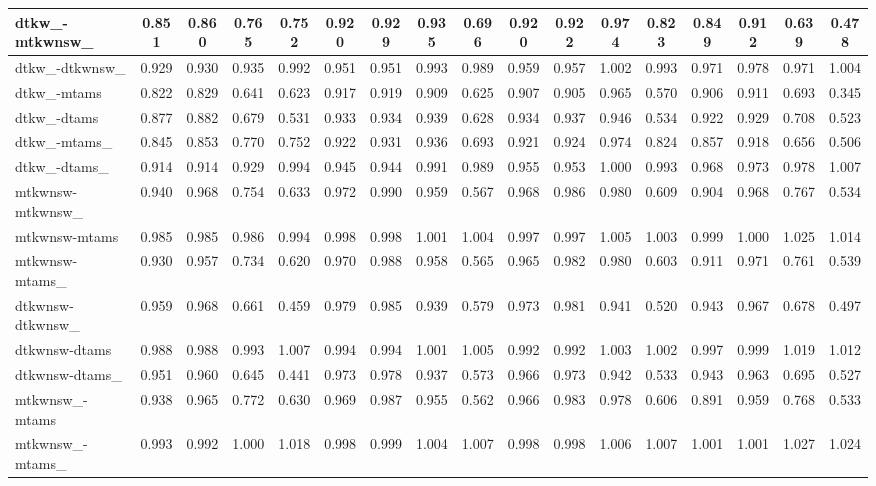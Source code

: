 \documentclass[%
 aip,
 jmp,%
 amsmath,amssymb,
 reprint,%
]{revtex4-1}
\begin{document}
\begin{longtable*}{|p{2cm}||c|c|c|c|| c|c|c|c|| c|c|c|c|| c|c|c|c|}
dtkw\_-mtkwnsw\_ & 0.851 & 0.860 & 0.765 & 0.752 & 0.920 & 0.929 & 0.935 & 0.696 & 0.920 & 0.922 & 0.974 & 0.823 & 0.849 & 0.912 & 0.639 & 0.478 \\ \hline
dtkw\_-dtkwnsw\_ & 0.929 & 0.930 & 0.935 & 0.992 & 0.951 & 0.951 & 0.993 & 0.989 & 0.959 & 0.957 & 1.002 & 0.993 & 0.971 & 0.978 & 0.971 & 1.004 \\ \hline
dtkw\_-mtams & 0.822 & 0.829 & 0.641 & 0.623 & 0.917 & 0.919 & 0.909 & 0.625 & 0.907 & 0.905 & 0.965 & 0.570 & 0.906 & 0.911 & 0.693 & 0.345 \\ \hline
dtkw\_-dtams & 0.877 & 0.882 & 0.679 & 0.531 & 0.933 & 0.934 & 0.939 & 0.628 & 0.934 & 0.937 & 0.946 & 0.534 & 0.922 & 0.929 & 0.708 & 0.523 \\ \hline
dtkw\_-mtams\_ & 0.845 & 0.853 & 0.770 & 0.752 & 0.922 & 0.931 & 0.936 & 0.693 & 0.921 & 0.924 & 0.974 & 0.824 & 0.857 & 0.918 & 0.656 & 0.506 \\ \hline
dtkw\_-dtams\_ & 0.914 & 0.914 & 0.929 & 0.994 & 0.945 & 0.944 & 0.991 & 0.989 & 0.955 & 0.953 & 1.000 & 0.993 & 0.968 & 0.973 & 0.978 & 1.007 \\ \hline
mtkwnsw-mtkwnsw\_ & 0.940 & 0.968 & 0.754 & 0.633 & 0.972 & 0.990 & 0.959 & 0.567 & 0.968 & 0.986 & 0.980 & 0.609 & 0.904 & 0.968 & 0.767 & 0.534 \\ \hline
mtkwnsw-mtams & 0.985 & 0.985 & 0.986 & 0.994 & 0.998 & 0.998 & 1.001 & 1.004 & 0.997 & 0.997 & 1.005 & 1.003 & 0.999 & 1.000 & 1.025 & 1.014 \\ \hline
mtkwnsw-mtams\_ & 0.930 & 0.957 & 0.734 & 0.620 & 0.970 & 0.988 & 0.958 & 0.565 & 0.965 & 0.982 & 0.980 & 0.603 & 0.911 & 0.971 & 0.761 & 0.539 \\ \hline
dtkwnsw-dtkwnsw\_ & 0.959 & 0.968 & 0.661 & 0.459 & 0.979 & 0.985 & 0.939 & 0.579 & 0.973 & 0.981 & 0.941 & 0.520 & 0.943 & 0.967 & 0.678 & 0.497 \\ \hline
dtkwnsw-dtams & 0.988 & 0.988 & 0.993 & 1.007 & 0.994 & 0.994 & 1.001 & 1.005 & 0.992 & 0.992 & 1.003 & 1.002 & 0.997 & 0.999 & 1.019 & 1.012 \\ \hline
dtkwnsw-dtams\_ & 0.951 & 0.960 & 0.645 & 0.441 & 0.973 & 0.978 & 0.937 & 0.573 & 0.966 & 0.973 & 0.942 & 0.533 & 0.943 & 0.963 & 0.695 & 0.527 \\ \hline
mtkwnsw\_-mtams & 0.938 & 0.965 & 0.772 & 0.630 & 0.969 & 0.987 & 0.955 & 0.562 & 0.966 & 0.983 & 0.978 & 0.606 & 0.891 & 0.959 & 0.768 & 0.533 \\ \hline
mtkwnsw\_-mtams\_ & 0.993 & 0.992 & 1.000 & 1.018 & 0.998 & 0.999 & 1.004 & 1.007 & 0.998 & 0.998 & 1.006 & 1.007 & 1.001 & 1.001 & 1.027 & 1.024 \\ \hline

\end{longtable*}
\end{document}
